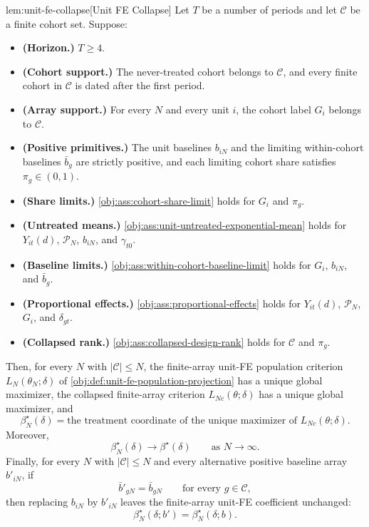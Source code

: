 \begin{propositionv}{lem:unit-fe-collapse}[Unit FE Collapse]
Let $T$ be a number of periods and let $\mathcal C$ be a finite cohort set. Suppose:
\begin{itemize}
\item \textbf{(Horizon.)} $T\ge 4$.
\item \textbf{(Cohort support.)} The never-treated cohort belongs to $\mathcal C$, and every finite cohort in $\mathcal C$ is dated after the first period.
\item \textbf{(Array support.)} For every $N$ and every unit $i$, the cohort label $G_i$ belongs to $\mathcal C$.
\item \textbf{(Positive primitives.)} The unit baselines $b_{iN}$ and the limiting within-cohort baselines $\bar b_g$ are strictly positive, and each limiting cohort share satisfies $\pi_g\in(0,1)$.
\item \textbf{(Share limits.)} \cref{obj:ass:cohort-share-limit} holds for $G_i$ and $\pi_g$.
\item \textbf{(Untreated means.)} \cref{obj:ass:unit-untreated-exponential-mean} holds for $Y_{it}(d)$, $\mathcal P_N$, $b_{iN}$, and $\gamma_{t0}$.
\item \textbf{(Baseline limits.)} \cref{obj:ass:within-cohort-baseline-limit} holds for $G_i$, $b_{iN}$, and $\bar b_g$.
\item \textbf{(Proportional effects.)} \cref{obj:ass:proportional-effects} holds for $Y_{it}(d)$, $\mathcal P_N$, $G_i$, and $\delta_{gt}$.
\item \textbf{(Collapsed rank.)} \cref{obj:ass:collapsed-design-rank} holds for $\mathcal C$ and $\pi_g$.
\end{itemize}
Then, for every $N$ with $|\mathcal C|\le N$, the finite-array unit-FE population criterion $L_N(\theta_N;\delta)$ of \cref{obj:def:unit-fe-population-projection} has a unique global maximizer, the collapsed finite-array criterion $L_{Nc}(\theta;\delta)$ has a unique global maximizer, and
\[
\beta_N^\star(\delta)
=
\text{the treatment coordinate of the unique maximizer of }L_{Nc}(\theta;\delta).
\]
Moreover,
\[
\beta_N^\star(\delta)\longrightarrow \beta^\star(\delta)
\qquad\text{as }N\to\infty .
\]
Finally, for every $N$ with $|\mathcal C|\le N$ and every alternative positive baseline array $b'_{iN}$, if
\[
\bar b'_{gN}=\bar b_{gN}
\qquad\text{for every }g\in\mathcal C,
\]
then replacing $b_{iN}$ by $b'_{iN}$ leaves the finite-array unit-FE coefficient unchanged:
\[
\beta_N^\star(\delta;b')=\beta_N^\star(\delta;b).
\]
\end{propositionv}

